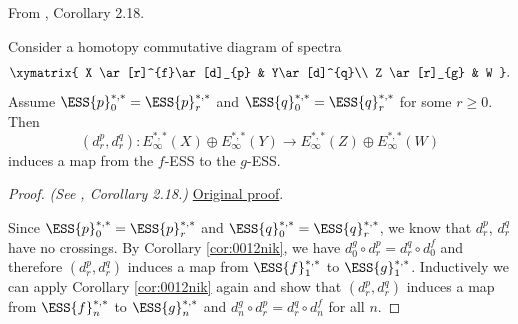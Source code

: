\begin{corollary}
\label{paper:2.18}
From \cite{LWX126}, Corollary 2.18.\par
\label{cor:e7b20ae2}
    Consider a homotopy commutative diagram of spectra
    $$\xymatrix{
    X \ar[r]^{f}\ar[d]_{p} & Y\ar[d]^{q}\\
    Z \ar[r]_{g} & W
    }.$$
    Assume $\ESS{p}_0^{*,*}=\ESS{p}_r^{*,*}$ and $\ESS{q}_0^{*,*}=\ESS{q}_r^{*,*}$ for some $r\ge 0$. Then 
    $$(d^p_r, d^q_r): E_\infty^{*,*}(X)\oplus E_\infty^{*,*}(Y)\to E_\infty^{*,*}(Z)\oplus E_\infty^{*,*}(W)$$
    induces a map from the $f$-ESS to the $g$-ESS.



\end{corollary}
\begin{proof}
\textit{(See \cite{LWX126}, Corollary 2.18.)} \href{paper/main.tex.html#L628}{Original proof}.

Since $\ESS{p}_0^{*,*}=\ESS{p}_r^{*,*}$ and $\ESS{q}_0^{*,*}=\ESS{q}_r^{*,*}$, we know that $d^p_r$, $d^q_r$ have no crossings. By Corollary \ref{cor:0012nik}, we have $d^g_0\circ d^p_r = d^q_r\circ d^f_0$ and therefore $(d^p_r, d^q_r)$ induces a map from $\ESS{f}_1^{*,*}$ to $\ESS{g}_1^{*,*}$. Inductively we can apply Corollary \ref{cor:0012nik} again and show that $(d^p_r, d^q_r)$ induces a map from $\ESS{f}_n^{*,*}$ to $\ESS{g}_n^{*,*}$ and $d^g_n\circ d^p_r = d^q_r\circ d^f_n$ for all $n$.
\end{proof}

